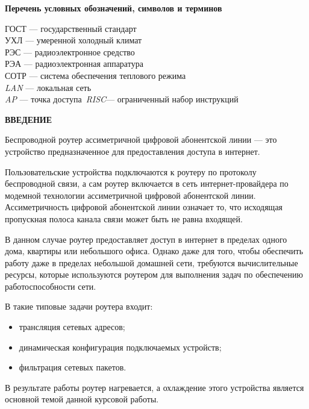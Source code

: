 \tableofcontents
\newpage
\begin{center}
\textbf{Перечень условных обозначений, символов и терминов}
\end{center}

ГОСТ — государственный стандарт\\
УХЛ — умеренной холодный климат\\
РЭС — радиоэлектронное средство\\
РЭА — радиоэлектронная аппаратура\\
СОТР — система обеспечения теплового режима\\
\textit{LAN} — локальная сеть\\
\textit{AP} — точка доступа\
\textit{RISC}— ограниченный набор инструкций\\


\newpage
\begin{center}
\textbf{ВВЕДЕНИЕ}
\end{center}

\par
Беспроводной роутер ассиметричной цифровой абонентской линии — это
устройство предназначенное для предоставления доступа в интернет.
\par
Пользовательские устройства подключаются к роутеру по протоколу
беспроводной связи, а сам роутер включается в сеть интернет-провайдера
по модемной технологии ассиметричной цифровой абонентской линии.
Ассиметричность цифровой абонентской линии означает то, что исходящая
пропускная полоса канала связи может быть не равна входящей.
\par
В данном случае роутер предоставляет доступ в интернет в пределах
одного дома, квартиры или небольшого офиса.
Однако даже для того, чтобы обеспечить работу даже в пределах
небольшой домашней сети, требуются вычислительные ресурсы,
которые используются роутером для выполнения задач
по обеспечению работоспособности сети.

В такие типовые задачи роутера входит:
\begin{itemize}[nosep]

\item трансляция сетевых адресов;
\item динамическая конфигурация подключаемых устройств;
\item фильтрация сетевых пакетов.
  
\end{itemize}

В результате работы роутер нагревается, а охлаждение этого устройства
является основной темой данной курсовой работы.

